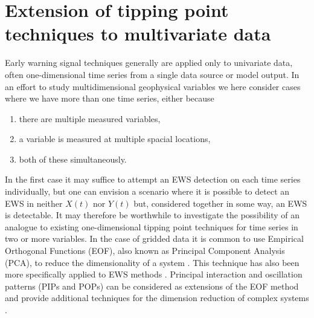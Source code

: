 
\chapter[Multivariate tipping point techniques]{Extension of tipping point techniques to multivariate data}
\label{chap:2D}

\graphicspath{{Chap_Multivariable/Figs/}}

    	Early warning signal techniques generally are applied only to univariate data, often one-dimensional time series from a single data source or model output. In an effort to study multidimensional geophysical variables we here consider cases where we have more than one time series, either because
    	\begin{enumerate}
    		\item there are multiple measured variables,
    		\item a variable is measured at multiple spacial locations,
    		\item both of these simultaneously.
    	\end{enumerate}  
    	In the first case it may suffice to attempt an EWS detection on each time series individually, but one can envision a scenario where it is possible to detect an EWS in neither $X(t)$ nor $Y(t)$ but, considered together in some way, an EWS is detectable. It may therefore be worthwhile to investigate the possibility of an analogue to existing one-dimensional tipping point techniques for time series in two or more variables. In the case of gridded data it is common to use Empirical Orthogonal Functions (EOF), also known as Principal Component Analysis (PCA), to reduce the dimensionality of a system \citep{vonstorch,jolliffe1986}. This technique has also been more specifically applied to EWS methods \citep{held2004,bathiany2013p1,kwasniok2018}. Principal interaction and oscillation patterns (PIPs and POPs) can be considered as extensions of the EOF method and provide additional techniques for the dimension reduction of complex systems \citep{hasselmann1988}.
    	
